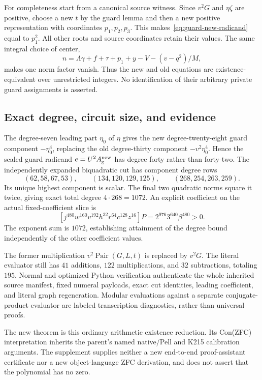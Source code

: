 For completeness start from a canonical source witness. Since $v^2G$
and $\eta\zeta$ are positive, choose a new $t$ by the guard lemma and
then a new positive representation with coordinates $p_1,p_2,p_3$.
This makes~\eqref{eq:guard-new-radicand} equal to $p_1^2$.
All other roots and source coordinates retain their values. The same
integral choice of center,
\[
 n=\Lambda\gamma+f+\tau+p_1+y-V-(v-q^2)/M,
\]
makes one norm factor vanish. Thus the new and old equations are
existence-equivalent over unrestricted integers. No identification of
their arbitrary private guard assignments is asserted.

\subsection{Exact degree, circuit size, and evidence}

The degree-seven leading part $\eta_0$ of $\eta$ gives the new
degree-twenty-eight guard component $-\eta_0^4$, replacing the old
degree-thirty component $-v^2\eta_0^4$. Hence the scaled guard
radicand $e=U^2A_{\rm g}^{\rm new}$ has degree forty rather than
forty-two. The independently expanded biquadratic cut has component
degree rows
\[
 (62,58,67,53),\qquad(134,120,129,125),\qquad
 (268,254,263,259).
\]
Its unique highest component is scalar. The final two quadratic norms
square it twice, giving exact total degree $4\cdot268=1072$.
An explicit coefficient on the actual fixed-coefficient slice is
\[
 [j^{480}w^{160}v^{192}h^{32}r^{64}c^{128}z^{16}]P
   =2^{976}3^{640}\beta^{480}>0.
\]
The exponent sum is $1072$, establishing attainment of the degree
bound independently of the other coefficient values.

The former multiplication $v^2\operatorname{Pair}(G,L,t)$ is
replaced by $v^2G$. The literal evaluator still has $41$ additions,
$122$ multiplications, and $32$ subtractions, totaling $195$.
Normal and optimized Python verification authenticate the whole
inherited source manifest, fixed numeral payloads, exact cut identities,
leading coefficient, and literal graph regeneration. Modular evaluations
against a separate conjugate-product evaluator are labeled transcription
diagnostics, rather than universal proofs.

The new theorem is this ordinary arithmetic existence reduction.
Its Con(ZFC) interpretation inherits the parent's named native/Pell and
K215 calibration arguments. The supplement supplies neither a new
end-to-end proof-assistant certificate nor a new object-language ZFC
derivation, and does not assert that the polynomial has no zero.
